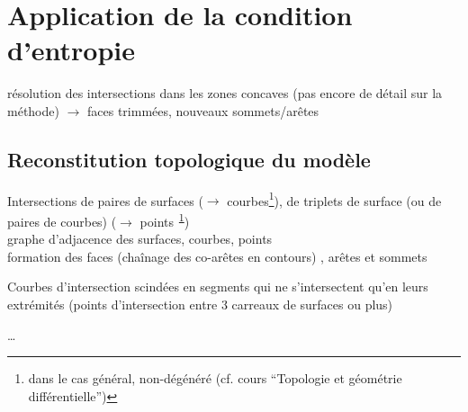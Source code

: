 \section{Application de la condition d'entropie}
résolution des intersections dans les zones concaves (pas encore de détail sur la méthode) $\to$ faces trimmées, nouveaux sommets/arêtes

\subsection{Reconstitution topologique du modèle \brep}
Intersections de paires de surfaces ($\to$ courbes\footnote{dans le cas général, non-dégénéré (cf. cours ``Topologie et géométrie différentielle'')\label{foot}}), de triplets de surface (ou de paires de courbes) ($\to$ points\textsuperscript{~\ref{foot}})\\
graphe d'adjacence des surfaces, courbes, points \cite[Chap. 4]{pentcheva2010}\\
formation des faces (chaînage des co-arêtes en contours) \cite[Chap. 7]{pentcheva2010}, arêtes et sommets \cite[Chap. 5]{pentcheva2010}

\par\medskip

Courbes d'intersection scindées en segments qui ne s'intersectent qu'en leurs extrémités (points d'intersection entre 3 carreaux de surfaces ou plus)



\ldots

